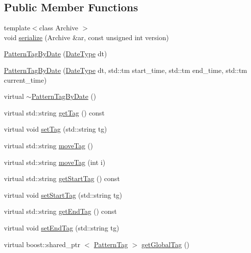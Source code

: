 \subsection*{\-Public \-Member \-Functions}
\begin{DoxyCompactItemize}
\item 
{\footnotesize template$<$class Archive $>$ }\\void \hyperlink{classcryomesh_1_1state_1_1PatternTagByDate_a1b9b91f249940e4f334dcba2e2d783b8}{serialize} (\-Archive \&ar, const unsigned int version)
\item 
\hyperlink{classcryomesh_1_1state_1_1PatternTagByDate_a81779c8abe73f88cf2c165d1a46b34a6}{\-Pattern\-Tag\-By\-Date} (\hyperlink{classcryomesh_1_1state_1_1PatternTagByDate_a0fe44df3214c9397e04ff9a4e8c57ad9}{\-Date\-Type} dt)
\item 
\hyperlink{classcryomesh_1_1state_1_1PatternTagByDate_ad018e686d9f5b6275cd7cc19971a686f}{\-Pattern\-Tag\-By\-Date} (\hyperlink{classcryomesh_1_1state_1_1PatternTagByDate_a0fe44df3214c9397e04ff9a4e8c57ad9}{\-Date\-Type} dt, std\-::tm start\-\_\-time, std\-::tm end\-\_\-time, std\-::tm current\-\_\-time)
\item 
virtual \hyperlink{classcryomesh_1_1state_1_1PatternTagByDate_ac2117051c13a443148321799601d8586}{$\sim$\-Pattern\-Tag\-By\-Date} ()
\item 
virtual std\-::string \hyperlink{classcryomesh_1_1state_1_1PatternTagByDate_a0f01388871f2e3a96d25ab92082cec4b}{get\-Tag} () const 
\item 
virtual void \hyperlink{classcryomesh_1_1state_1_1PatternTagByDate_aae131c046e25f41bcd08b19658ca0cc0}{set\-Tag} (std\-::string tg)
\item 
virtual std\-::string \hyperlink{classcryomesh_1_1state_1_1PatternTagByDate_acbd442ea1927dc9eab7683e67d82ab6c}{move\-Tag} ()
\item 
virtual std\-::string \hyperlink{classcryomesh_1_1state_1_1PatternTagByDate_aa38857773222e320697dbfede65ed36f}{move\-Tag} (int i)
\item 
virtual std\-::string \hyperlink{classcryomesh_1_1state_1_1PatternTagByDate_aba2a73f929cba2baa5d51965509230e3}{get\-Start\-Tag} () const 
\item 
virtual void \hyperlink{classcryomesh_1_1state_1_1PatternTagByDate_a9b01bf590164b4644c6d942fc0a3a67b}{set\-Start\-Tag} (std\-::string tg)
\item 
virtual std\-::string \hyperlink{classcryomesh_1_1state_1_1PatternTagByDate_a52262ecad476ba4890bd622addd844f2}{get\-End\-Tag} () const 
\item 
virtual void \hyperlink{classcryomesh_1_1state_1_1PatternTagByDate_a2177a240135e1db32da7c38617a68f31}{set\-End\-Tag} (std\-::string tg)
\item 
virtual boost\-::shared\-\_\-ptr\*
$<$ \hyperlink{classcryomesh_1_1state_1_1PatternTag}{\-Pattern\-Tag} $>$ \hyperlink{classcryomesh_1_1state_1_1PatternTagByDate_a4a34d0d5566ae8a3888b8c7a747bef6b}{get\-Global\-Tag} ()
\end{DoxyCompactItemize}

